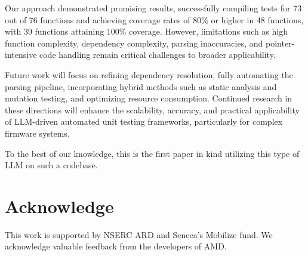 \documentclass[conference]{IEEEtran}
\begin{document}
Our approach demonstrated promising results, successfully compiling tests for 73 out of 76 functions and achieving coverage rates of 80\% or higher in 48 functions, with 39 functions attaining 100\% coverage. However, limitations such as high function complexity, dependency complexity, parsing inaccuracies, and pointer-intensive code handling remain critical challenges to broader applicability. 

Future work will focus on refining dependency resolution, fully automating the parsing pipeline, incorporating hybrid methods such as static analysis and mutation testing, and optimizing resource consumption. Continued research in these directions will enhance the scalability, accuracy, and practical applicability of LLM-driven automated unit testing frameworks, particularly for complex firmware systems. 

To the best of our knowledge, this is the first paper in kind utilizing this type of LLM on such a codebase.

\section{Acknowledge}
This work is supported by NSERC ARD and Seneca’s Mobilize fund. We acknowledge valuable feedback from the developers of AMD. 
\end{document}
